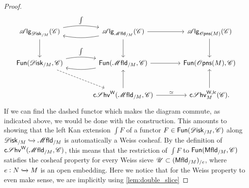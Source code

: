 \documentclass[../text]{subfiles}
\begin{document}
\begin{proof}
\begin{equation}
\begin{tikzcd}[row sep = large, column sep = large]
            \alg{\disk_{/M}} (\catC) \arrow[r, bend left=10, "\int"] \arrow[d] & \alg{\mfld_{/M}} (\catC) \arrow[l, bend left=10] \arrow[r] \arrow[d] & \alg{\opens(M)} (\catC) \arrow[d] \\
            \mathsf{Fun}(\disk_{/M}, \catC) \arrow[r, bend left=10, "\int"] \arrow[dr, dashed] & \mathsf{Fun}(\mfld_{/M}, \catC) \arrow[l, bend left=10] \arrow[r] & \mathsf{Fun}(\opens(M), \catC) \\
            & \csheaves[W](\mfld_{/M}, \catC) \arrow[r, "\simeq"] \arrow[u] & \csheaves[W, lc]_M(\catC) \arrow[u].
        \end{tikzcd}
    \end{equation}
    If we can find the dashed functor which makes the diagram commute, as indicated above, we would be done with the construction. This amounts to showing that the left Kan extension $\int F$ of a functor $F \in \mathsf{Fun}(\disk_{/M}, \catC)$ along $\disk_{/M} \xhookrightarrow{} \mfld_{/M}$ is automatically a Weiss cosheaf. By the definition of $\csheaves[W](\mfld_{/M}, \catC)$, this means that the restriction of $\int F$ to $\mathsf{Fun}(\mfld[r]_{/M}, \catC)$ satisfies the cosheaf property for every Weiss sieve $\mathscr{U} \subset (\mfld[r]_{/M})_{/e}$, where $e:N \xhookrightarrow{} M$ is an open embedding. Here we notice that for the Weiss property to even make sense, we are implicitly using \cref{lem:double_slice}
    

\end{proof}
\end{document}

